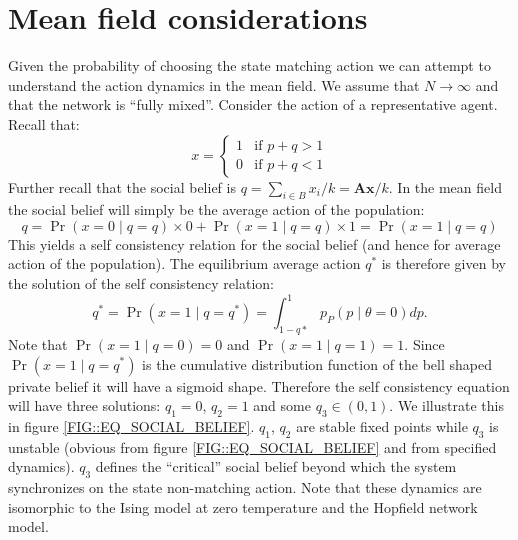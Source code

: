 \documentclass[10pt,a4paper]{article}
\begin{document}
\section{Mean field considerations}
Given the probability of choosing the state matching action we can attempt to understand the action dynamics in the mean field. We assume that $N \rightarrow \infty$ and that the network is ``fully mixed''. Consider the action of a representative agent. Recall that:
\begin{equation}
x = \begin{cases} 1 &\mbox{if } p+q > 1  \\
0 & \mbox{if } p+q < 1 \end{cases}
\end{equation}
Further recall that the social belief is $q = \sum_{i \in B} x_i / k = \mathbf{A} \mathbf{x} / k$. In the mean field the social belief will simply be the average action of the population:
\begin{equation}
q = \Pr(x = 0 \mid q = q)\times 0 + \Pr(x = 1 \mid q = q)\times 1 = \Pr(x = 1 \mid q = q)
\end{equation}
This yields a self consistency relation for the social belief (and hence for average action of the population). The equilibrium average action $q^*$ is therefore given by the solution of the self consistency relation:
\begin{equation}
q^* = \Pr(x = 1 \mid q = q^*) = \int_{1-q*}^1 p_P(p \mid \theta = 0) dp.
\end{equation}
Note that  $\Pr(x = 1 \mid q = 0) = 0$ and $\Pr(x = 1 \mid q = 1) = 1$. Since $\Pr(x = 1 \mid q = q^*)$ is the cumulative distribution function of the bell shaped private belief it will have a sigmoid shape. Therefore the self consistency equation will have three solutions: $q_1=0$, $q_2=1$ and some $q_3 \in (0,1)$. We illustrate this in figure \ref{FIG::EQ_SOCIAL_BELIEF}. $q_1$, $q_2$ are stable fixed points while $q_3$ is unstable (obvious from figure \ref{FIG::EQ_SOCIAL_BELIEF} and from specified dynamics). $q_3$ defines the ``critical'' social belief beyond which the system synchronizes on the state non-matching action. Note that these dynamics are isomorphic to the Ising model at zero temperature and the Hopfield network model.
\end{document}
